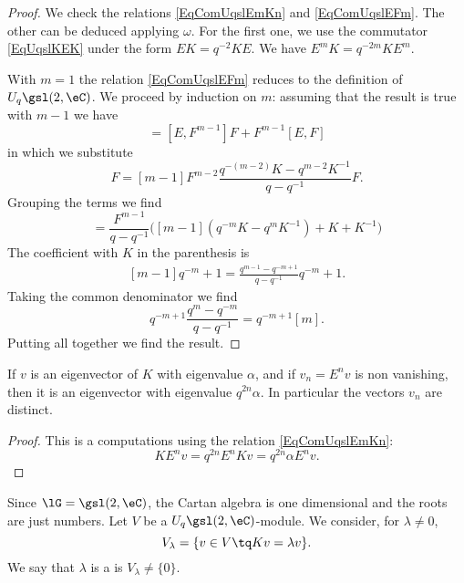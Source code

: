 \begin{proof}
	We check the relations \eqref{EqComUqslEmKn} and \eqref{EqComUqslEFm}. The other can be deduced applying \( \omega\). For the first one, we use the commutator \eqref{EqUqslKEK} under the form \( EK=q^{-2}KE\). We have \( E^mK=q^{-2m}KE^m\).

	With \( m=1\) the relation \eqref{EqComUqslEFm} reduces to the definition of \( U_q\gsl(2,\eC)\). We proceed by induction on \( m\): assuming that the result is true with \( m-1\) we have
	\begin{equation}
		[E,F^{m}]=[E,F^{m-1}]F+F^{m-1}[E,F]
	\end{equation}
	in which we substitute
	\begin{equation}
		[E,F^{m-1}]F=[m-1]F^{m-2}\frac{ q^{-(m-2)}K-q^{m-2}K^{-1} }{ q-q^{-1} }F.
	\end{equation}
	Grouping the terms we find
	\begin{equation}
		[E,F^{m}]=\frac{ F^{m-1} }{ q-q^{-1} }\Big( [m-1](q^{-m}K-q^mK^{-1})+K+K^{-1} \Big)
	\end{equation}
	The coefficient with \( K\) in the parenthesis is
	\begin{subequations}
		\begin{align}
			[m-1]q^{-m}+1=\frac{ q^{m-1}-q^{-m+1} }{ q-q^{-1} }q^{-m}+1.
		\end{align}
	\end{subequations}
	Taking the common denominator we find
	\begin{equation}
		q^{-m+1}\frac{ q^m-q^{-m} }{ q-q^{-1} }=q^{-m+1}[m].
	\end{equation}
	Putting all together we find the result.
\end{proof}

\begin{corollary}       \label{CorvKEnvKvaep}
	If \( v\) is an eigenvector of \( K\) with eigenvalue \( \alpha\), and if \( v_n=E^nv\) is non vanishing, then it is an eigenvector with eigenvalue \( q^{2n}\alpha\). In particular the vectors \( v_n\) are distinct.
\end{corollary}

\begin{proof}
	This is a computations using the relation \eqref{EqComUqslEmKn}:
	\begin{equation}
		KE^nv=q^{2n}E^nKv=q^{2n}\alpha E^nv.
	\end{equation}
\end{proof}

Since \( \lG=\gsl(2,\eC)\), the Cartan algebra is one dimensional and the roots are just numbers. Let \( V\) be a \( U_q\gsl(2,\eC)\)-module. We consider, for \( \lambda\neq 0\),
\begin{equation}
	V_{\lambda}=\{ v\in V\tq Kv=\lambda v \}.
\end{equation}
We say that \( \lambda\) is a  is \( V_{\lambda}\neq\{ 0 \}\).

